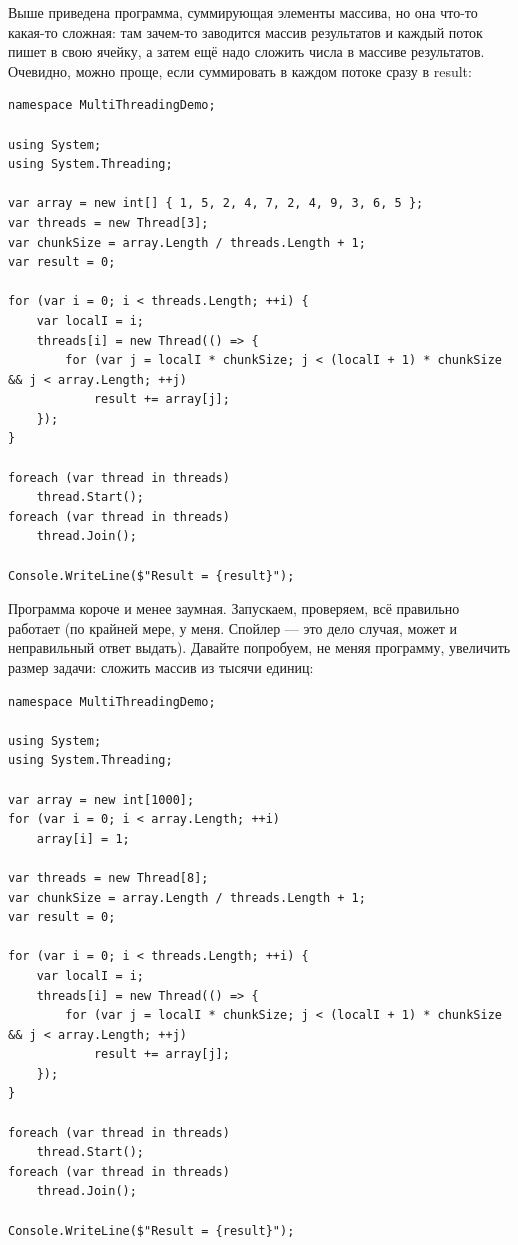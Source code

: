 \documentclass{../../text-style}
\begin{document}
Выше приведена программа, суммирующая элементы массива, но она что-то какая-то сложная: там зачем-то заводится массив результатов и каждый поток пишет в свою ячейку, а затем ещё надо сложить числа в массиве результатов. Очевидно, можно проще, если суммировать в каждом потоке сразу в result:

\begin{small}
    \begin{verbatim}
namespace MultiThreadingDemo;

using System;
using System.Threading;

var array = new int[] { 1, 5, 2, 4, 7, 2, 4, 9, 3, 6, 5 };
var threads = new Thread[3];
var chunkSize = array.Length / threads.Length + 1;
var result = 0;

for (var i = 0; i < threads.Length; ++i) {
    var localI = i;
    threads[i] = new Thread(() => {
        for (var j = localI * chunkSize; j < (localI + 1) * chunkSize && j < array.Length; ++j)
            result += array[j];
    });
}

foreach (var thread in threads)
    thread.Start();
foreach (var thread in threads)
    thread.Join();

Console.WriteLine($"Result = {result}");
    \end{verbatim}
\end{small}

Программа короче и менее заумная. Запускаем, проверяем, всё правильно работает (по крайней мере, у меня. Спойлер --- это дело случая, может и неправильный ответ выдать). Давайте попробуем, не меняя программу, увеличить размер задачи: сложить массив из тысячи единиц:

\begin{small}
    \begin{verbatim}
namespace MultiThreadingDemo;

using System;
using System.Threading;

var array = new int[1000];
for (var i = 0; i < array.Length; ++i)
    array[i] = 1;

var threads = new Thread[8];
var chunkSize = array.Length / threads.Length + 1;
var result = 0;

for (var i = 0; i < threads.Length; ++i) {
    var localI = i;
    threads[i] = new Thread(() => {
        for (var j = localI * chunkSize; j < (localI + 1) * chunkSize && j < array.Length; ++j)
            result += array[j];
    });
}

foreach (var thread in threads)
    thread.Start();
foreach (var thread in threads)
    thread.Join();

Console.WriteLine($"Result = {result}");
    \end{verbatim}
\end{small}
\end{document}
